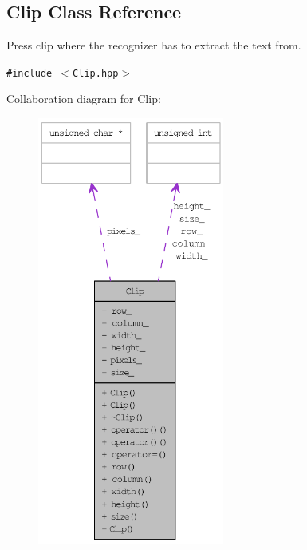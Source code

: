 \hypertarget{class_clip}{
\subsection{Clip Class Reference}
\label{class_clip}
}
Press clip where the recognizer has to extract the text from.  


{\tt \#include $<$Clip.hpp$>$}

Collaboration diagram for Clip:\nopagebreak
\begin{figure}[H]
\begin{center}
\leavevmode
\includegraphics[height=400pt]{class_clip__coll__graph}
\end{center}
\end{figure}
